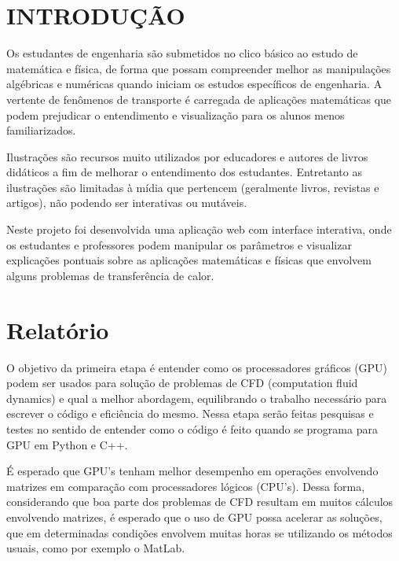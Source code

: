 \documentclass[12pt,a4paper]{article}
\begin{document}
\begin{center}
    \tableofcontents
\end{center}

\newpage

\section{INTRODUÇÃO}

Os estudantes de engenharia são submetidos no clico básico ao estudo de matemática e física, de forma que possam compreender melhor as manipulações algébricas e numéricas quando iniciam os estudos específicos de engenharia. A vertente de fenômenos de transporte é carregada de aplicações matemáticas que podem prejudicar o entendimento e visualização para os alunos menos familiarizados.

Ilustrações são recursos muito utilizados por educadores e autores de livros didáticos a fim de melhorar o entendimento dos estudantes. Entretanto as ilustrações são limitadas à mídia que pertencem (geralmente livros, revistas e artigos), não podendo ser interativas ou mutáveis.

Neste projeto foi desenvolvida uma aplicação web com interface interativa, onde os estudantes e professores podem manipular os parâmetros e visualizar explicações pontuais sobre as aplicações matemáticas e físicas que envolvem alguns problemas de transferência de calor.

\section{Relatório}

O objetivo da primeira etapa é entender como os processadores gráficos (GPU) podem ser usados para solução de problemas de CFD (computation fluid dynamics) e qual a melhor abordagem, equilibrando o trabalho necessário para escrever o código e eficiência do mesmo. Nessa etapa serão feitas pesquisas e testes no sentido de entender como o código é feito quando se programa para GPU em Python e C++.

É esperado que GPU's tenham melhor desempenho em operações envolvendo matrizes em comparação com processadores lógicos (CPU's). Dessa forma, considerando que boa parte dos problemas de CFD resultam em muitos cálculos envolvendo matrizes, é esperado que o uso de GPU possa acelerar as soluções, que em determinadas condições envolvem muitas horas se utilizando os métodos usuais, como por exemplo o MatLab.
\end{document}

